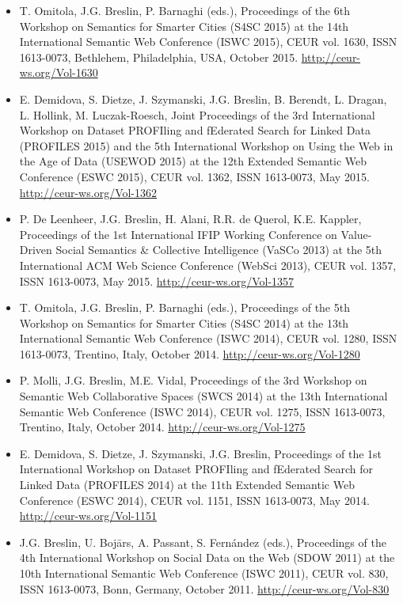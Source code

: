 \documentclass[10pt,a4paper]{res} %
\begin{document}
\begin{resume}
\begin{itemize}
\item T. Omitola, J.G. Breslin, P. Barnaghi (eds.), Proceedings of the 6th Workshop on Semantics for Smarter Cities (S4SC 2015) at the 14th International Semantic Web Conference (ISWC 2015), CEUR vol. 1630, ISSN 1613-0073, Bethlehem, Philadelphia, USA, October 2015. \url{http://ceur-ws.org/Vol-1630}
\item E. Demidova, S. Dietze, J. Szymanski, J.G. Breslin, B. Berendt, L. Dragan, L. Hollink, M. Luczak-Roesch, Joint Proceedings of the 3rd International Workshop on Dataset PROFIling and fEderated Search for Linked Data (PROFILES 2015) and the 5th International Workshop on Using the Web in the Age of Data (USEWOD 2015) at the 12th Extended Semantic Web Conference (ESWC 2015), CEUR vol. 1362, ISSN 1613-0073, May 2015. \url{http://ceur-ws.org/Vol-1362}
\item P. De Leenheer, J.G. Breslin, H. Alani, R.R. de Querol, K.E. Kappler, Proceedings of the 1st International IFIP Working Conference on Value-Driven Social Semantics \& Collective Intelligence (VaSCo 2013) at the 5th International ACM Web Science Conference (WebSci 2013), CEUR vol. 1357, ISSN 1613-0073, May 2015. \url{http://ceur-ws.org/Vol-1357}
\item T. Omitola, J.G. Breslin, P. Barnaghi (eds.), Proceedings of the 5th Workshop on Semantics for Smarter Cities (S4SC 2014) at the 13th International Semantic Web Conference (ISWC 2014), CEUR vol. 1280, ISSN 1613-0073, Trentino, Italy, October 2014. \url{http://ceur-ws.org/Vol-1280}
\item P. Molli, J.G. Breslin, M.E. Vidal, Proceedings of the 3rd Workshop on Semantic Web Collaborative Spaces (SWCS 2014) at the 13th International Semantic Web Conference (ISWC 2014), CEUR vol. 1275, ISSN 1613-0073, Trentino, Italy, October 2014.  \url{http://ceur-ws.org/Vol-1275}
\item E. Demidova, S. Dietze, J. Szymanski, J.G. Breslin, Proceedings of the 1st International Workshop on Dataset PROFIling and fEderated Search for Linked Data (PROFILES 2014) at the 11th Extended Semantic Web Conference (ESWC 2014), CEUR vol. 1151, ISSN 1613-0073, May 2014. \url{http://ceur-ws.org/Vol-1151}
\item J.G. Breslin, U. Boj\={a}rs, A. Passant, S. Fern\'{a}ndez (eds.), Proceedings of the 4th International Workshop on Social Data on the Web (SDOW 2011) at the 10th International Semantic Web Conference (ISWC 2011), CEUR vol. 830, ISSN 1613-0073, Bonn, Germany, October 2011. \url{http://ceur-ws.org/Vol-830}

\end{itemize}
\end{resume}
\end{document}
